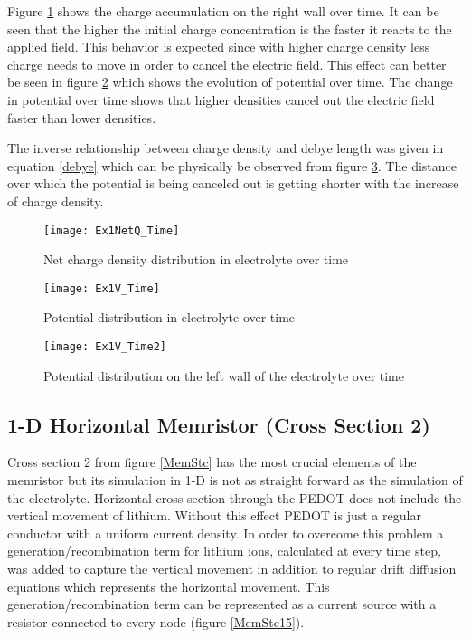 Figure \ref{ElectrolyteQzoom} shows the charge accumulation on the right wall over time. It can be seen that the higher the initial charge concentration is the faster it reacts to the applied field. This behavior is expected since with higher charge density less charge needs to move in order to cancel the electric field. This effect can better be seen in figure \ref{ElectrolyteV} which shows the evolution of potential over time. The change in potential over time shows that higher densities cancel out the electric field faster than lower densities.

The inverse relationship between charge density and debye length was given in equation \ref{debye} which can be physically be observed from figure  \ref{ElectrolyteV2}. The distance over which the potential is being canceled out is getting shorter with the increase of charge density.  

 
\begin{landscape}
\begin{figure}[!htp]
\centering
\texttt{[image: Ex1NetQ\_Time]}
\caption{Net charge density distribution in electrolyte over time} 
\label{ElectrolyteQzoom}
\end{figure}
\end{landscape}

\begin{landscape}
\begin{figure}[!htp]
\centering
\texttt{[image: Ex1V\_Time]}
\caption{Potential distribution in electrolyte over time} 
\label{ElectrolyteV}
\end{figure}
\end{landscape}

 
\begin{landscape}
\begin{figure}[!htp]
\centering
\texttt{[image: Ex1V\_Time2]}
\caption{Potential distribution on the left wall of the electrolyte over time} 
\label{ElectrolyteV2}
\end{figure}
\end{landscape}

\clearpage
\subsection{1-D Horizontal Memristor (Cross Section 2)}

Cross section 2 from figure \ref{MemStc} has the most crucial elements of the memristor but its simulation in 1-D is not as straight forward as the simulation of the electrolyte. Horizontal cross section through the PEDOT does not include the vertical movement of lithium. Without this effect PEDOT is just a regular conductor with a uniform current density. In order to overcome this problem a generation/recombination term for lithium ions, calculated at every time step, was added to capture the vertical movement in addition to regular drift diffusion equations which represents the horizontal movement. This generation/recombination term can be represented as a current source with a resistor connected to every node (figure \ref{MemStc15}). 

